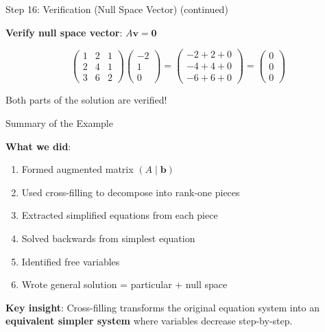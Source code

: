 \documentclass[10pt]{beamer}
\theoremstyle{definition}
\newcommand{\x}[1]{\alert{\textbf{#1}}}
\begin{document}
\begin{frame}{Step 16: Verification (Null Space Vector) (continued)}

\x{Verify null space vector}: $A\mathbf{v} = \mathbf{0}$

$$\begin{pmatrix} 1&2&1 \\ 2&4&1 \\ 3&6&2 \end{pmatrix} \begin{pmatrix} -2\\1\\0 \end{pmatrix} = \begin{pmatrix} -2+2+0 \\ -4+4+0 \\ -6+6+0 \end{pmatrix} = \begin{pmatrix} 0\\0\\0 \end{pmatrix}$$ \checkmark

\vspace{1em}

Both parts of the solution are verified!

\end{frame}

\begin{frame}{Summary of the Example}

\x{What we did}:
\begin{enumerate}
\item Formed augmented matrix $(A \mid \mathbf{b})$
\item Used cross-filling to decompose into rank-one pieces
\item Extracted simplified equations from each piece
\item Solved backwards from simplest equation
\item Identified free variables
\item Wrote general solution = particular + null space
\end{enumerate}

\vspace{1em}

\x{Key insight}: Cross-filling transforms the original equation system into an \textbf{equivalent simpler system} where variables decrease step-by-step.

\end{frame}
\end{document}
